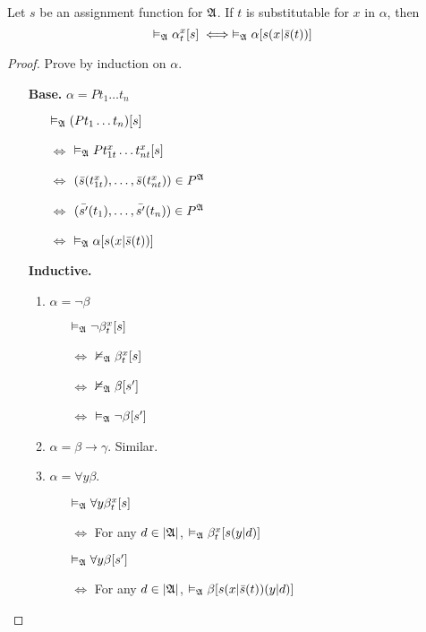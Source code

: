 \begin{lemma}
    \label{lem:SubstitutionLemma}
    Let $s$ be an assignment function for $\mathfrak{A}$. If $t$ is substitutable for $x$ in $\alpha$, then
    \[ \vDash_{\mathfrak{A}}\alpha_t^x[s] \iff \vDash_{\mathfrak{A}}\alpha[s(x|\bar{s}(t))] \]
\end{lemma}
\begin{proof}
    Prove by induction on $\alpha$.
    \begin{itemize}
        \item[] \textbf{Base.} $\alpha = Pt_1\dots t_n$
        \begin{itemize}
            \item[] $\vDash_{\mathfrak{A}}(Pt_1\dots t_n)[s]$
            \item[$\iff$] $\vDash_{\mathfrak{A}}Pt_{1t}^x\dots t_{nt}^x[s]$ 
            \item[$\iff$] $(\bar{s}(t_{1t}^x),\dots,\bar{s}(t_{nt}^x)) \in P^{\mathfrak{A}}$
            \item[$\iff$] $(\bar{s'}(t_1),\dots,\bar{s'}(t_n)) \in P^{\mathfrak{A}}$
            \item[$\iff$] $\vDash_{\mathfrak{A}}\alpha[s(x|\bar{s}(t))]$
        \end{itemize}
        \item[] \textbf{Inductive.} \begin{enumerate}
            \item  $\alpha = \neg \beta$
            \begin{itemize}
                \item[] $\vDash_{\mathfrak{A}}\neg \beta_t^x[s]$
                \item[$\iff$] $\nvDash_{\mathfrak{A}}\beta_t^x[s]$
                \item[$\iff$] $\nvDash_{\mathfrak{A}}\beta[s']$
                \item[$\iff$] $\vDash_{\mathfrak{A}}\neg\beta[s']$
            \end{itemize}
            \item $\alpha = \beta \to \gamma$. Similar.
            \item $\alpha = \forall y \beta$.
            \begin{itemize}
                \item[] $\vDash_{\mathfrak{A}}\forall y \beta_t^x[s]$
                \item[$\iff$] For any $d \in |\mathfrak{A}|$, $\vDash_{\mathfrak{A}}\beta_t^x[s(y|d)]$
                \item[] $\vDash_{\mathfrak{A}}\forall y\beta[s']$
                \item[$\iff$] For any $d \in |\mathfrak{A}|$, $\vDash_{\mathfrak{A}}\beta[s(x|\bar{s}(t))(y|d)]$

\end{itemize}
\end{enumerate}
\end{itemize}
\end{proof}
